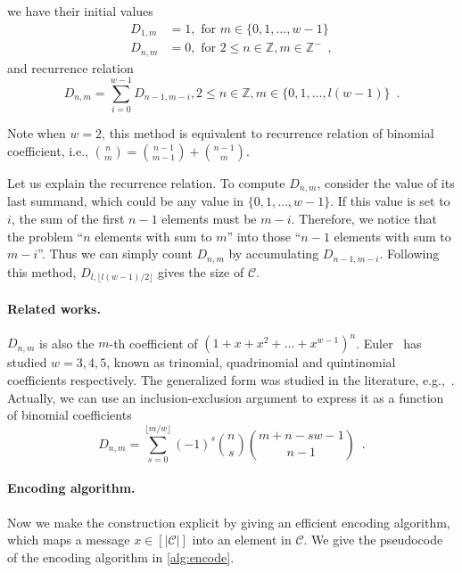 we have their initial values
\begin{align*}
D_{1,m} &= 1 , \mbox{ for }m\in \{0,1,\dots,w-1\} \\
D_{n,m} &= 0 , \mbox{ for }2\leq n \in \mathbb{Z}, m \in \mathbb{Z^-} \enspace ,
\end{align*}
and recurrence relation
\begin{equation} \label{equ:recurrence}
    D_{n,m} = \sum_{i=0}^{w-1} D_{n-1,m-i} , 2 \leq n \in \mathbb{Z},m\in \{0,1,\dots,l(w-1)\} \enspace . 
\end{equation}

Note when $w=2$, this method is equivalent to recurrence relation of binomial coefficient, i.e., $\binom{n}{m}=\binom{n-1}{m-1}+\binom{n-1}{m}$.

Let us explain the recurrence relation. To compute $D_{n,m}$,  consider the value of its last summand, which could be any value in $\{0,1,\dots,w-1\}$. If this value is set to $i$, the sum of the first $n-1$ elements must be $m-i$. Therefore, we notice that  the problem ``$n$ elements with sum to $m$'' into those ``$n-1$ elements with sum to $m-i$''. Thus we can simply count $D_{n,m}$ by accumulating $D_{n-1,m-i}$.
Following this method, $D_{l,\lfloor l(w-1)/2 \rfloor}$ gives the size of $\mathcal{C}$.

\paragraph{Related works.} $D_{n,m}$ is also the $m$-th coefficient of $(1+x+x^2+\dots+x^{w-1})^n$. Euler~\cite{euler1801evolutione} has studied $w=3,4,5$, known as trinomial, quadrinomial and quintinomial  coefficients respectively. The generalized form was  studied in the literature, e.g.,~\cite{andre1876memoire,warnaar1997andrews,belbachir2020congruence}. Actually, we can use an inclusion-exclusion argument to express it as a function of binomial coefficients~\cite{28861}
$$ D_{n,m} = \sum_{s=0}^{\lfloor{m/w}\rfloor} (-1)^s \binom{n}{s} \binom{m+n-sw-1}{n-1} \enspace .$$

\paragraph{Encoding algorithm.} Now we make the construction explicit by giving an efficient encoding algorithm, which maps a message $x\in [|\mathcal{C}|]$ into an element in $\mathcal{C}$.
We give the pseudocode of the encoding algorithm in \cref{alg:encode}.
\begin{algorithm}
\caption{Encode:$[|\mathcal{C}|]\rightarrow\mathcal{C}$.} \label{alg:encode}
\end{algorithm}

